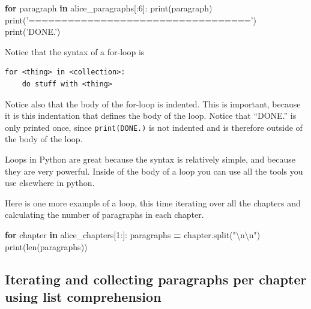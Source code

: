 \documentclass[]{book}
\newenvironment{Shaded}{\begin{snugshade}}{\end{snugshade}}
\newcommand{\KeywordTok}[1]{\textcolor[rgb]{0.13,0.29,0.53}{\textbf{#1}}}
\newcommand{\DecValTok}[1]{\textcolor[rgb]{0.00,0.00,0.81}{#1}}
\newcommand{\CharTok}[1]{\textcolor[rgb]{0.31,0.60,0.02}{#1}}
\newcommand{\StringTok}[1]{\textcolor[rgb]{0.31,0.60,0.02}{#1}}
\newcommand{\ControlFlowTok}[1]{\textcolor[rgb]{0.13,0.29,0.53}{\textbf{#1}}}
\newcommand{\OperatorTok}[1]{\textcolor[rgb]{0.81,0.36,0.00}{\textbf{#1}}}
\newcommand{\BuiltInTok}[1]{#1}
\newcommand{\NormalTok}[1]{#1}
\begin{document}
\begin{Shaded}
\begin{Highlighting}[]
\ControlFlowTok{for}\NormalTok{ paragraph }\KeywordTok{in}\NormalTok{ alice_paragraphs[:}\DecValTok{6}\NormalTok{]:}
    \BuiltInTok{print}\NormalTok{(paragraph)}
    \BuiltInTok{print}\NormalTok{(}\StringTok{'=================================='}\NormalTok{)}
\BuiltInTok{print}\NormalTok{(}\StringTok{'DONE.'}\NormalTok{)}
\end{Highlighting}
\end{Shaded}

Notice that the syntax of a for-loop is

\begin{verbatim}
for <thing> in <collection>:
    do stuff with <thing>
\end{verbatim}

Notice also that the body of the for-loop is indented. This is
important, because it is this indentation that defines the body of the
loop. Notice that ``DONE.'' is only printed once, since
\texttt{print(\textquotesingle{}DONE.\textquotesingle{})} is not
indented and is therefore outside of the body of the loop.

Loops in Python are great because the syntax is relatively simple, and
because they are very powerful. Inside of the body of a loop you can use
all the tools you use elsewhere in python.

Here is one more example of a loop, this time iterating over all the
chapters and calculating the number of paragraphs in each chapter.

\begin{Shaded}
\begin{Highlighting}[]
\ControlFlowTok{for}\NormalTok{ chapter }\KeywordTok{in}\NormalTok{ alice_chapters[}\DecValTok{1}\NormalTok{:]:}
\NormalTok{    paragraphs }\OperatorTok{=}\NormalTok{ chapter.split(}\StringTok{"}\CharTok{\textbackslash{}n\textbackslash{}n}\StringTok{"}\NormalTok{)}
    \BuiltInTok{print}\NormalTok{(}\BuiltInTok{len}\NormalTok{(paragraphs))}
\end{Highlighting}
\end{Shaded}

\subsection{Iterating and collecting paragraphs per chapter using list
comprehension}\label{iterating-and-collecting-paragraphs-per-chapter-using-list-comprehension}
\end{document}
